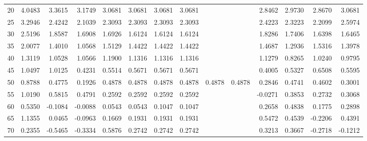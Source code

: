\begin{tabular}{lrrrrrrrrrrrrr}
20  &          4.0483 &       3.3615 &      3.1749 &         3.0681 &        3.0681 &        3.0681 &        3.0681 &               &               &    2.8462 &      2.9730 &     2.8670 &        3.0681 \\
25  &          3.2946 &       2.4242 &      2.1039 &         2.3093 &        2.3093 &        2.3093 &        2.3093 &               &               &    2.4223 &      2.3223 &     2.2099 &        2.5974 \\
30  &          2.5196 &       1.8587 &      1.6908 &         1.6926 &        1.6124 &        1.6124 &        1.6124 &               &               &    1.8286 &      1.7406 &     1.6398 &        1.6465 \\
35  &          2.0077 &       1.4010 &      1.0568 &         1.5129 &        1.4422 &        1.4422 &        1.4422 &               &               &    1.4687 &      1.2936 &     1.5316 &        1.3978 \\
40  &          1.3119 &       1.0528 &      1.0566 &         1.1900 &        1.1316 &        1.1316 &        1.1316 &               &               &    1.1279 &      0.8265 &     1.0240 &        0.9795 \\
45  &          1.0497 &       1.0125 &      0.4231 &         0.5514 &        0.5671 &        0.5671 &        0.5671 &               &               &    0.4005 &      0.5327 &     0.6508 &        0.5595 \\
50  &          0.8788 &       0.4775 &      0.1926 &         0.4878 &        0.4878 &        0.4878 &        0.4878 &        0.4878 &        0.4878 &    0.2846 &      0.4741 &     0.4602 &        0.3001 \\
55  &          1.0190 &       0.5815 &      0.4791 &         0.2592 &        0.2592 &        0.2592 &        0.2592 &               &               &   -0.0271 &      0.3853 &     0.2732 &        0.3068 \\
60  &          0.5350 &      -0.1084 &     -0.0088 &         0.0543 &        0.0543 &        0.1047 &        0.1047 &               &               &    0.2658 &      0.4838 &     0.1775 &        0.2898 \\
65  &          1.1355 &       0.0465 &     -0.0963 &         0.1669 &        0.1931 &        0.1931 &        0.1931 &               &               &    0.5472 &      0.4539 &    -0.2206 &        0.4391 \\
70  &          0.2355 &      -0.5465 &     -0.3334 &         0.5876 &        0.2742 &        0.2742 &        0.2742 &               &               &    0.3213 &      0.3667 &    -0.2718 &       -0.1212 \\

\end{tabular}
